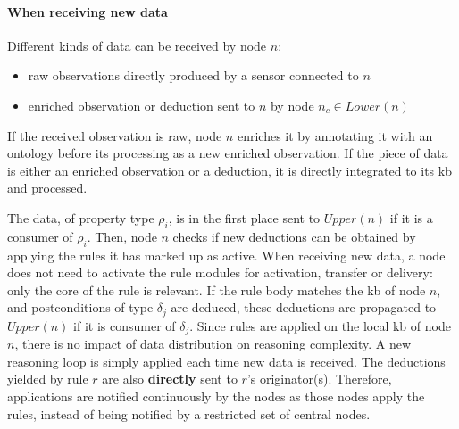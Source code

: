 \documentclass{iosart2c}
\begin{document}
\paragraph{When receiving new data}

Different kinds of data can be received by node $n$:
\begin{itemize}
	\item raw observations directly produced by a sensor connected to $n$%
	\item enriched observation or deduction sent to $n$ by node $n_c \in Lower(n)$%
\end{itemize}
If the received observation is raw, node $n$ enriches it by annotating it with an ontology before its processing as a new enriched observation. 
If the piece of data is either an enriched observation or a deduction, it is directly integrated to its \gls{kb} and processed. 

The data, of property type $\rho_{i}$, is in the first place sent to $Upper(n)$ if it is a consumer of $\rho_{i}$. 
Then, node $n$ checks if new deductions can be obtained by applying the rules it has marked up as active.
When receiving new data, a node does not need to activate the rule modules for activation, transfer or delivery: only the core of the rule is relevant.
If the rule body matches the \gls{kb} of node $n$, and postconditions of type $\delta_{j}$ are deduced, these deductions are propagated to $Upper(n)$ if it is consumer of $\delta_{j}$.
Since rules are applied on the local \gls{kb} of node $n$, there is no impact of data distribution on reasoning complexity. 
A new reasoning loop is simply applied each time new data is received.
The deductions yielded by rule $r$ are also \textbf{directly} sent to $r$'s originator(s).
Therefore, applications are notified continuously by the nodes as those nodes apply the rules, instead of being notified by a restricted set of central nodes.

%	
\end{document}
